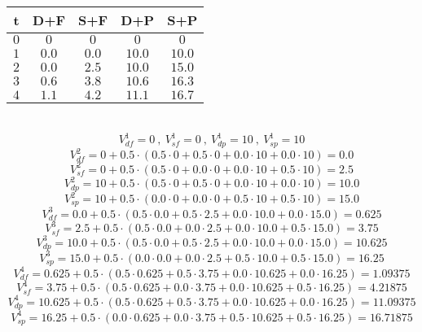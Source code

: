 \documentclass[fleqn]{hw4}
\begin{document}
\begin{enumerate}
\begin{tabular}{|c||c|c|c|c|}
\hline
{\bf t} & D+F & S+F & D+P & S+P \\
\hline
$0$ & $0$ & $0$ & $0$  & $0$  \\
\hline
$1$ & $0.0$ & $0.0$ & $10.0$ & $10.0$ \\
\hline
$2$ & $0.0$ & $2.5$ & $10.0$ & $15.0$ \\
\hline
$3$ & $0.6$ & $3.8$ & $10.6$ & $16.3$ \\
\hline
$4$ & $1.1$ & $4.2$ & $11.1$ & $16.7$ \\
\hline
\end{tabular}\\
$$ V_{df}^{1}=0 \ , \ V_{sf}^{1}=0 \ , \ V_{dp}^{1}=10 \ , \ V_{sp}^{1}=10 $$
$$ V_{df}^{2}=0 + 0.5\cdot ( 0.5 \cdot 0+ 0.5 \cdot 0+ 0.0 \cdot 10+ 0.0 \cdot 10 )=0.0 $$
$$ V_{sf}^{2}=0 + 0.5\cdot ( 0.5 \cdot 0+ 0.0 \cdot 0+ 0.0 \cdot 10+ 0.5 \cdot 10 )=2.5 $$
$$ V_{dp}^{2}=10 + 0.5\cdot ( 0.5 \cdot 0+ 0.5 \cdot 0+ 0.0 \cdot 10+ 0.0 \cdot 10 )=10.0 $$
$$ V_{sp}^{2}=10 + 0.5\cdot ( 0.0 \cdot 0+ 0.0 \cdot 0+ 0.5 \cdot 10+ 0.5 \cdot 10 )=15.0 $$
$$ V_{df}^{3}=0.0 + 0.5\cdot ( 0.5 \cdot 0.0+ 0.5 \cdot 2.5+ 0.0 \cdot 10.0+ 0.0 \cdot 15.0 )=0.625 $$
$$ V_{sf}^{3}=2.5 + 0.5\cdot ( 0.5 \cdot 0.0+ 0.0 \cdot 2.5+ 0.0 \cdot 10.0+ 0.5 \cdot 15.0 )=3.75 $$
$$ V_{dp}^{3}=10.0 + 0.5\cdot ( 0.5 \cdot 0.0+ 0.5 \cdot 2.5+ 0.0 \cdot 10.0+ 0.0 \cdot 15.0 )=10.625 $$
$$ V_{sp}^{3}=15.0 + 0.5\cdot ( 0.0 \cdot 0.0+ 0.0 \cdot 2.5+ 0.5 \cdot 10.0+ 0.5 \cdot 15.0 )=16.25 $$
$$ V_{df}^{4}=0.625 + 0.5\cdot ( 0.5 \cdot 0.625+ 0.5 \cdot 3.75+ 0.0 \cdot 10.625+ 0.0 \cdot 16.25 )=1.09375 $$
$$ V_{sf}^{4}=3.75 + 0.5\cdot ( 0.5 \cdot 0.625+ 0.0 \cdot 3.75+ 0.0 \cdot 10.625+ 0.5 \cdot 16.25 )=4.21875 $$
$$ V_{dp}^{4}=10.625 + 0.5\cdot ( 0.5 \cdot 0.625+ 0.5 \cdot 3.75+ 0.0 \cdot 10.625+ 0.0 \cdot 16.25 )=11.09375 $$
$$ V_{sp}^{4}=16.25 + 0.5\cdot ( 0.0 \cdot 0.625+ 0.0 \cdot 3.75+ 0.5 \cdot 10.625+ 0.5 \cdot 16.25 )=16.71875 $$


\end{enumerate}
\end{document}
